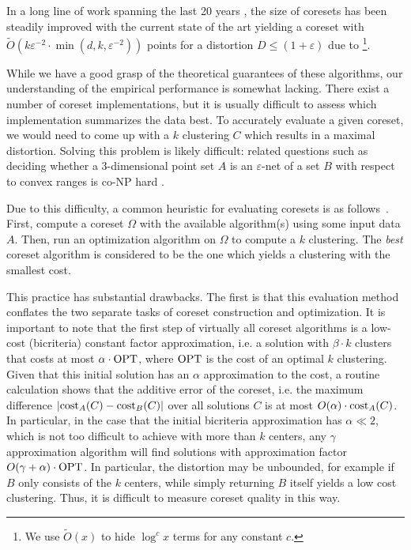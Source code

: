 In a long line of work spanning the last 20 years
\cite{BecchettiBC0S19,BravermanJKW21,Chen09,Cohen-AddadSS21b,Cohen-AddadSS21,FeldmanL11,FeldmanSS20,
HaM04,HaK07,HuangJLW18,huang2020coresets,BravermanJKW21,
LangbergS10,SohlerW18}, the size of coresets has been steadily improved with the current state of the art yielding a coreset with $\tilde{O}(k \varepsilon^{-2} \cdot \min(d,k,\varepsilon^{-2}))$ points for a distortion $D\leq (1+\varepsilon)$ due to \cite{CLSS22}\footnote{We use $\tilde O(x)$ to hide $\log^c x$ terms for any constant $c$.}.

While we have a good grasp of the theoretical guarantees of these algorithms, our understanding of the empirical performance is somewhat lacking. There exist a number of coreset implementations, but it is usually difficult to assess which implementation summarizes the data best. To accurately evaluate a given coreset, we would need to come up with a $k$ clustering $C$ which results in a maximal distortion. Solving this problem is likely difficult: related questions such as deciding whether a 3-dimensional point set $A$ is an $\varepsilon$-net of a set $B$ with respect to convex ranges is co-NP hard \cite{GiannopoulosKWW12}. 

Due to this difficulty, a common heuristic for evaluating coresets is as follows~\cite{AckermannMRSLS12,FGSSS13}. First, compute a coreset $\Omega$ with the available algorithm(s) using some input data $A$. Then, run an optimization algorithm on $\Omega$ to compute a $k$ clustering. The \emph{best} coreset algorithm is considered to be the one which yields a clustering with the smallest cost.

This practice has substantial drawbacks.
The first is that this evaluation method conflates the two separate tasks of coreset construction and optimization.
It is important to note that the first step of virtually all coreset algorithms is a low-cost (bicriteria) constant factor approximation, i.e. a solution with $\beta\cdot k$ clusters that costs at most $\alpha\cdot \text{OPT}$, where $\text{OPT}$ is the cost of an optimal $k$ clustering.
Given that this initial solution has an $\alpha$ approximation to the cost, a routine calculation shows that the additive error of the coreset, i.e. the maximum difference
$ \left\vert \text{cost}_A(C) - \text{cost}_B(C) \right\vert $
over all solutions $C$ is at most $O(\alpha)\cdot \text{cost}_A(C)$. 
In particular, in the case that the initial bicriteria approximation has $\alpha \ll 2$, which is not too difficult to achieve with more than $k$ centers, any $\gamma$ approximation algorithm will find solutions with approximation factor $O(\gamma + \alpha) \cdot\text{OPT}$. In particular, the distortion may be unbounded, for example if $B$ only consists of the $k$ centers, while simply returning $B$ itself yields a low cost clustering. Thus, it is difficult to measure coreset quality in this way.

